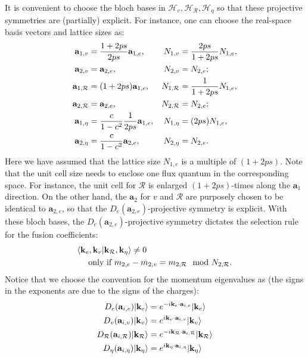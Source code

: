 It is convenient to choose the bloch bases in $\mathcal H_v,\mathcal H_{\mathcal R}, \mathcal H_{\eta}$ so that these projective symmetries are (partially) explicit. For instance, one can choose the real-space basis vectors and lattice sizes as:
\begin{align}
    \mathbf a_{1,v}          & =\frac{1+2ps}{2ps}\mathbf a_{1,e},            & N_{1,v}          & =\frac{2ps}{1+2ps} N_{1,e},\notag \\
    \mathbf a_{2,v}          & =\mathbf a_{2,e},                             & N_{2,v}          & =N_{2,e};\notag                   \\
    \mathbf a_{1,\mathcal R} & =(1+2ps)\mathbf a_{1,e},                      & N_{1,\mathcal R} & =\frac{1}{1+2ps} N_{1,e},\notag   \\
    \mathbf a_{2,\mathcal R} & =\mathbf a_{2,e},                             & N_{2,\mathcal R} & =N_{2,e};\notag                   \\
    \mathbf a_{1,\eta}       & =\frac{c}{1-c^2}\frac{1}{2ps}\mathbf a_{1,e}, & N_{1,\eta}       & =(2ps) N_{1,e},\notag             \\
    \mathbf a_{2,\eta}       & =\frac{c}{1-c^2} \mathbf a_{2,e},             & N_{2,\eta}       & =N_{2,e}.\label{eq:bloch_bases}
\end{align}
Here we have assumed that the lattice size $N_{1,e}$ is a multiple of $(1+2ps)$. Note that the unit cell size needs to enclose one flux quantum in the corresponding space. For instance, the unit cell for $\mathcal R$ is enlarged $(1+2ps)$-times along the $\mathbf a_{1}$ direction. On the other hand, the $\mathbf a_2$ for $v$ and $\mathcal R$ are purposely chosen to be identical to $\mathbf a_{2,e}$, so that the $D_e(\mathbf a_{2,e})$-projective symmetry is explicit.  With these bloch bases, the $D_e(\mathbf a_{2,e})$-projective symmetry dictates the selection rule for the fusion coefficients:
\begin{align}
     & \langle \mathbf k_e,\mathbf k_v|\mathbf k_{\mathcal R},\mathbf k_{\eta} \rangle \neq 0 \notag          \\
     & \quad\text{ only if } m_{2,e}-m_{2,v}=m_{2,\mathcal R} \mod N_{2,\mathcal R}.\label{eq:CG_selection_2}
\end{align}
Notice that we choose the convention for the momentum eigenvalues as (the signs in the exponents are due to the signs of the charges):
\begin{align}
    D_e(\mathbf a_{i,e})|\mathbf k_e\rangle                                & =e^{-i\mathbf k_e\cdot \mathbf a_{i,e}}|\mathbf k_e\rangle\notag                                \\
    D_v(\mathbf a_{i,v})|\mathbf k_v\rangle                                & =e^{i\mathbf k_v\cdot \mathbf a_{i,v}}|\mathbf k_v\rangle\notag                                 \\
    D_{\mathcal R}(\mathbf a_{i,\mathcal R})|\mathbf k_{\mathcal R}\rangle & =e^{-i\mathbf k_{\mathcal R}\cdot \mathbf a_{i,\mathcal R}}|\mathbf k_{\mathcal R}\rangle\notag \\
    D_{\eta}(\mathbf a_{i,\eta})|\mathbf k_{\eta}\rangle                   & =e^{i\mathbf k_{\eta}\cdot \mathbf a_{i,\eta}}|\mathbf k_{\eta}\rangle
\end{align}
